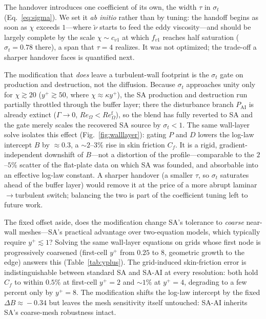 \documentclass[journal]{new-aiaa}
\begin{document}
The handover introduces one coefficient of its own, the width $\tau$ in
$\sigma_t$ (Eq.~\eqref{eq:sigma}). We set it \emph{ab initio} rather than
by tuning: the handoff begins as soon as $\chi$ exceeds $1$---where $\tilde\nu$
starts to feed the eddy viscosity---and should be largely complete by the scale
$\chi\!\sim\!c_{v1}$ at which $f_{v1}$ reaches half saturation
($\sigma_t\!=\!0.78$ there), a span that $\tau\!=\!4$ realizes. It was not
optimized; the trade-off a sharper handover faces is quantified next.

The modification that \emph{does} leave a turbulent-wall footprint is the
$\sigma_t$ gate on production and destruction, not the diffusion. Because
$\sigma_t$ approaches unity only for
$\chi\!\gtrsim\!20$ ($y^+\!\gtrsim\!50$, where $\chi\!\approx\!\kappa y^+$), the SA
production and destruction run partially throttled through the buffer layer; there
the disturbance branch $P_\mathrm{AI}$ is already extinct ($\Gamma\!\to\!0$,
$Re_\Omega\!<\!Re_\Omega^{\mathrm{f}}$), so the blend has fully reverted to SA and
the gate merely scales the recovered SA source by $\sigma_t\!<\!1$. The same
wall-layer solve isolates this effect (Fig.~\ref{fig:walllayer}): gating $P$ and
$D$ lowers the log-law intercept $B$ by $\approx\!0.3$, a $\sim\!2$--$3\%$ rise in
skin friction $C_f$. It is a rigid, gradient-independent downshift of $B$---not
a distortion of the profile---comparable to the $2$--$5\%$ scatter of the flat-plate
data on which SA was founded, and absorbable into an effective log-law constant. A
sharper handover (a smaller $\tau$, so $\sigma_t$ saturates ahead of the buffer
layer) would remove it at the price of a more abrupt laminar$\to$turbulent switch;
balancing the two is part of the coefficient tuning left to future work.

The fixed offset aside, does the modification change SA's tolerance to
\emph{coarse} near-wall meshes---SA's practical advantage over two-equation models,
which typically require $y^+\!\lesssim\!1$? Solving the same wall-layer equations on
grids whose first node is progressively coarsened (first-cell $y^+$ from $0.25$ to
$8$, geometric growth to the edge) answers this (Table~\ref{tab:yplus}).
The grid-induced skin-friction error is indistinguishable between standard SA and
SA-AI at every resolution: both hold $C_f$ to within $0.5\%$ at first-cell
$y^+\!=\!2$ and $\sim\!1\%$ at $y^+\!=\!4$, degrading to a few percent only by
$y^+\!=\!8$. The modification shifts the log-law intercept by the fixed
$\Delta B\!\approx\!-0.34$ but leaves the mesh sensitivity itself untouched: SA-AI
inherits SA's coarse-mesh robustness intact.
\end{document}
